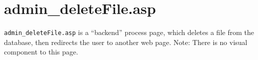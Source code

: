 \section{admin\_deleteFile.asp}
\verb|admin_deleteFile.asp| is a ``backend'' process page, which deletes a file from the
database, then redirects the user to another web page.  Note: There is no visual
component to this page.


